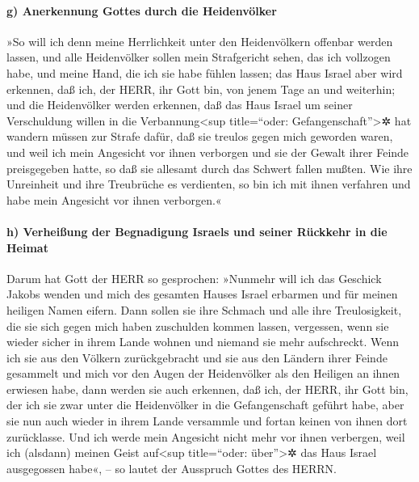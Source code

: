 \hypertarget{g-anerkennung-gottes-durch-die-heidenvuxf6lker}{%
\paragraph{g) Anerkennung Gottes durch die
Heidenvölker}\label{g-anerkennung-gottes-durch-die-heidenvuxf6lker}}

»So will ich denn meine Herrlichkeit unter den
Heidenvölkern offenbar werden lassen, und alle Heidenvölker sollen mein
Strafgericht sehen, das ich vollzogen habe, und meine Hand, die ich sie
habe fühlen lassen; das Haus Israel aber wird erkennen,
daß ich, der HERR, ihr Gott bin, von jenem Tage an und weiterhin;
und die Heidenvölker werden erkennen, daß das Haus Israel
um seiner Verschuldung willen in die Verbannung\textless sup
title=``oder: Gefangenschaft''\textgreater✲ hat wandern müssen zur
Strafe dafür, daß sie treulos gegen mich geworden waren, und weil ich
mein Angesicht vor ihnen verborgen und sie der Gewalt ihrer Feinde
preisgegeben hatte, so daß sie allesamt durch das Schwert fallen mußten.
Wie ihre Unreinheit und ihre Treubrüche es verdienten, so
bin ich mit ihnen verfahren und habe mein Angesicht vor ihnen
verborgen.«

\hypertarget{h-verheiuxdfung-der-begnadigung-israels-und-seiner-ruxfcckkehr-in-die-heimat}{%
\paragraph{h) Verheißung der Begnadigung Israels und seiner Rückkehr in
die
Heimat}\label{h-verheiuxdfung-der-begnadigung-israels-und-seiner-ruxfcckkehr-in-die-heimat}}

Darum hat Gott der HERR so gesprochen: »Nunmehr will ich
das Geschick Jakobs wenden und mich des gesamten Hauses Israel erbarmen
und für meinen heiligen Namen eifern. Dann sollen sie
ihre Schmach und alle ihre Treulosigkeit, die sie sich gegen mich haben
zuschulden kommen lassen, vergessen, wenn sie wieder sicher in ihrem
Lande wohnen und niemand sie mehr aufschreckt. Wenn ich
sie aus den Völkern zurückgebracht und sie aus den Ländern ihrer Feinde
gesammelt und mich vor den Augen der Heidenvölker als den Heiligen an
ihnen erwiesen habe, dann werden sie auch erkennen, daß
ich, der HERR, ihr Gott bin, der ich sie zwar unter die Heidenvölker in
die Gefangenschaft geführt habe, aber sie nun auch wieder in ihrem Lande
versammle und fortan keinen von ihnen dort zurücklasse.
Und ich werde mein Angesicht nicht mehr vor ihnen
verbergen, weil ich (alsdann) meinen Geist auf\textless sup
title=``oder: über''\textgreater✲ das Haus Israel ausgegossen habe«, --
so lautet der Ausspruch Gottes des HERRN.

